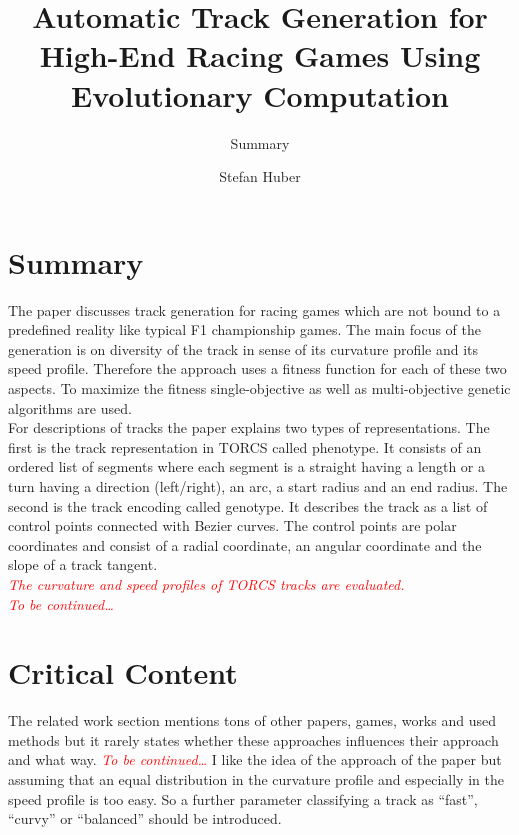 \documentclass[oneside, notitlepage, twocolumn]{scrartcl}
\title{\LARGE Automatic Track Generation for High-End Racing Games Using Evolutionary Computation}
\subtitle{Summary}
\author{Stefan Huber}
\newcommand{\draft}[1]{\textcolor{red}{\textit{#1}}}
\begin{document}
\maketitle

\section{Summary}
The paper discusses track generation for racing games which are not bound to a predefined reality like typical F1 championship games.
The main focus of the generation is on diversity of the track in sense of its curvature profile and its speed profile.
Therefore the approach uses a fitness function for each of these two aspects.
To maximize the fitness single-objective as well as multi-objective genetic algorithms are used.\\
For descriptions of tracks the paper explains two types of representations.
The first is the track representation in TORCS called phenotype.
It consists of an ordered list of segments where each segment is a straight having a length or a turn having a direction (left/right), an arc, a start radius and an end radius.
The second is the track encoding called genotype.
It describes the track as a list of control points connected with Bezier curves.
The control points are polar coordinates and consist of a radial coordinate, an angular coordinate and the slope of a track tangent.\\
\draft{The curvature and speed profiles of TORCS tracks are evaluated.}\\
\draft{To be continued\ldots}

\section{Critical Content}
The related work section mentions tons of other papers, games, works and used methods but it rarely states whether these approaches influences their approach and what way.
\draft{To be continued\ldots}
I like the idea of the approach of the paper but assuming that an equal distribution in the curvature profile and especially in the speed profile is too easy.
So a further parameter classifying a track as ``fast'', ``curvy'' or ``balanced'' should be introduced.
\end{document}
